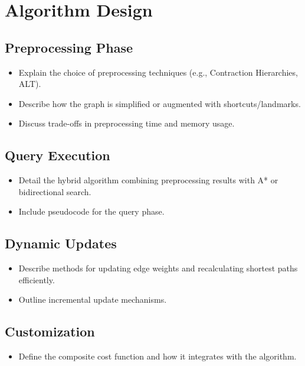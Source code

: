 \chapter{Algorithm Design}

\section{Preprocessing Phase}
	\begin{itemize}
		\item Explain the choice of preprocessing techniques (e.g., Contraction Hierarchies, ALT).
		\item Describe how the graph is simplified or augmented with shortcuts/landmarks.
		\item Discuss trade-offs in preprocessing time and memory usage.
	\end{itemize}
\section{Query Execution}
	\begin{itemize}
		\item Detail the hybrid algorithm combining preprocessing results with A* or bidirectional search.
		\item Include pseudocode for the query phase.
	\end{itemize}
\section{Dynamic Updates}
	\begin{itemize}
		\item Describe methods for updating edge weights and recalculating shortest paths efficiently.
		\item Outline incremental update mechanisms.
	\end{itemize}
\section{Customization}
	\begin{itemize}
		\item Define the composite cost function and how it integrates with the algorithm.
	\end{itemize}